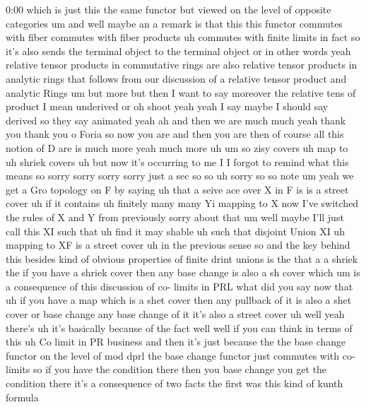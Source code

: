 \begin{unfinished}{0:00}
which  is  just  this  the  same  functor  but
viewed  on  the  level  of  opposite
categories
um  and  well  maybe  an  a  remark  is  that
this  this  functor  commutes  with  fiber
commutes  with  fiber
products
uh  commutes  with  finite  limits  in  fact
so  it's  also  sends  the  terminal  object
to  the  terminal
object  or  in  other  words  yeah  relative
tensor  products  in  commutative  rings  are
also  relative  tensor  products  in
analytic
rings  that  follows  from  our  discussion
of  a  relative  tensor  product  and
analytic  Rings  um  but  more  but  then  I
want  to  say
moreover  the  relative  tens  of
product  I  mean  underived  or
oh  shoot  yeah  yeah  I  say  maybe  I  should
say
derived  so  they  say  animated  yeah  ah  and
then  we  are  much  much  yeah  thank  you
thank  you  o  Foria  so  now  you  are  and
then  you  are  then  of  course  all  this
notion  of  D  are  is  much  more  yeah  much
more
uh
um  so  zisy
covers  uh  map  to  uh  shriek
covers  uh  but  now  it's  occurring  to  me  I
I  forgot  to  remind  what  this  means  so
sorry  sorry  sorry  sorry  just  a  sec
so  so  uh  sorry  so  so  note  um  yeah  we  get
a  Gro
topology  on
F  by
saying  uh  that  a
seive
ace  over  X  in
F  is  is  a  street
cover  uh  if  it
contains  uh  finitely
many  many
Yi  mapping  to  X  now  I've  switched  the
rules  of  X  and  Y  from  previously  sorry
about  that  um  well  maybe  I'll  just  call
this  XI  such  that  uh  find  it  may  shable
uh  such  that  disjoint  Union  XI  uh
mapping  to  XF  is  a  street
cover  uh  in  the  previous  sense
so  and  the  key  behind  this  besides  kind
of  obvious  properties  of  finite  drint
unions  is  the  that  a  a  shriek  the  if  you
have  a  shriek  cover  then  any  base  change
is  also  a  sh
cover  which  um
is  a  consequence  of  this  discussion  of
co-  limits  in
PRL  what  did  you  say  now
that  uh  if  you  have  a  map  which  is  a
shet  cover  then  any  pullback  of  it  is
also  a  shet
cover  or  base  change  any  base  change  of
it  it's  also  a  street
cover  uh  well  yeah  there's  uh  it's
basically  because  of  the  fact  well  well
if  you  can  think  in  terms  of  this  uh  Co
limit  in  PR  business  and  then  it's  just
because  the  the  base  change  functor  on
the  level  of  mod  dprl  the  base  change
functor  just  commutes  with  co-  limits  so
if  you  have  the  condition  there  then  you
base  change  you  get  the  condition
there  it's  a  consequence  of  two  facts
the  first  was  this  kind  of  kunth  formula

\end{unfinished}
